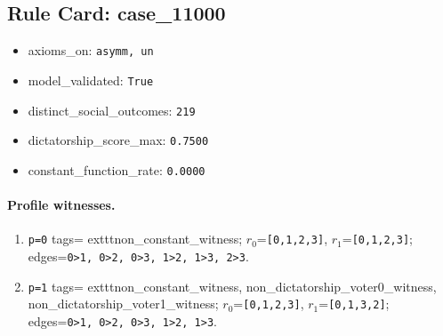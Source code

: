 \subsection*{Rule Card: case\_11000}
\begin{itemize}
\item axioms\_on: \texttt{asymm, un}
\item model\_validated: \texttt{True}
\item distinct\_social\_outcomes: \texttt{219}
\item dictatorship\_score\_max: \texttt{0.7500}
\item constant\_function\_rate: \texttt{0.0000}
\end{itemize}
\paragraph{Profile witnesses.}
\begin{enumerate}
\item \texttt{p=0} tags=	exttt{non\_constant\_witness}; $r_0$=\texttt{[0,1,2,3]}, $r_1$=\texttt{[0,1,2,3]}; edges=\texttt{0>1, 0>2, 0>3, 1>2, 1>3, 2>3}.
\item \texttt{p=1} tags=	exttt{non\_constant\_witness, non\_dictatorship\_voter0\_witness, non\_dictatorship\_voter1\_witness}; $r_0$=\texttt{[0,1,2,3]}, $r_1$=\texttt{[0,1,3,2]}; edges=\texttt{0>1, 0>2, 0>3, 1>2, 1>3}.
\end{enumerate}
